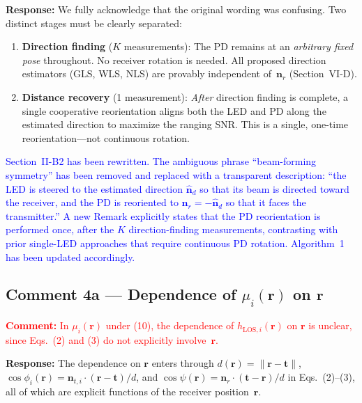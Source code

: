 \documentclass[11pt]{article}
\newcommand{\reviewercomment}[1]{\noindent\textcolor{red}{\textbf{Comment:} #1}\par\vspace{6pt}}
\newcommand{\response}{\noindent\textbf{Response:} }
\newcommand{\change}[1]{\textcolor{blue}{#1}}
\begin{document}
\response We fully acknowledge that the original wording was confusing. Two distinct stages must be clearly separated:

\begin{enumerate}[leftmargin=*]
    \item \textbf{Direction finding} ($K$ measurements): The PD remains at an \emph{arbitrary fixed pose} throughout. No receiver rotation is needed. All proposed direction estimators (GLS, WLS, NLS) are provably independent of~$\mathbf{n}_r$ (Section~VI-D).
    \item \textbf{Distance recovery} (1 measurement): \emph{After} direction finding is complete, a single cooperative reorientation aligns both the LED and PD along the estimated direction to maximize the ranging SNR. This is a single, one-time reorientation---not continuous rotation.
\end{enumerate}

\change{Section~II-B2 has been rewritten. The ambiguous phrase ``beam-forming symmetry'' has been removed and replaced with a transparent description: ``the LED is steered to the estimated direction $\hat{\mathbf{n}}_d$ so that its beam is directed toward the receiver, and the PD is reoriented to $\mathbf{n}_r = -\hat{\mathbf{n}}_d$ so that it faces the transmitter.'' A new Remark explicitly states that the PD reorientation is performed once, after the $K$ direction-finding measurements, contrasting with prior single-LED approaches that require continuous PD rotation. Algorithm~1 has been updated accordingly.}

\subsection{Comment 4a --- Dependence of $\mu_i(\mathbf{r})$ on $\mathbf{r}$}

\reviewercomment{In $\mu_i(\mathbf{r})$ under (10), the dependence of $h_{\text{LOS},i}(\mathbf{r})$ on $\mathbf{r}$ is unclear, since Eqs.~(2) and (3) do not explicitly involve~$\mathbf{r}$.}

\response The dependence on $\mathbf{r}$ enters through $d(\mathbf{r}) = \|\mathbf{r} - \mathbf{t}\|$, $\cos\phi_i(\mathbf{r}) = \mathbf{n}_{t,i}\cdot(\mathbf{r}-\mathbf{t})/d$, and $\cos\psi(\mathbf{r}) = \mathbf{n}_r\cdot(\mathbf{t}-\mathbf{r})/d$ in Eqs.~(2)--(3), all of which are explicit functions of the receiver position~$\mathbf{r}$.
\end{document}
